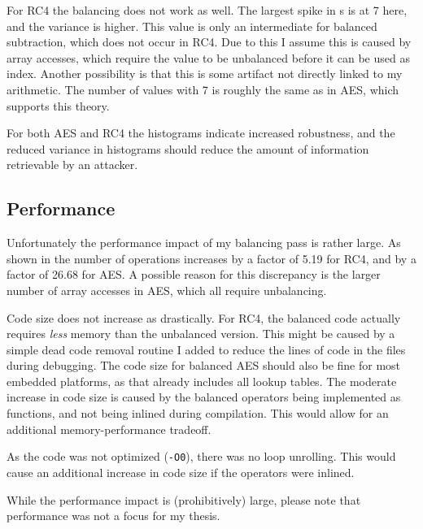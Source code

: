 For RC4 the balancing does not work as well.
The largest spike in \hammingw{}s is at 7 here, and the variance is higher.
This value is only an intermediate \hammingw{} for balanced subtraction, which does not occur in RC4.
Due to this I assume this is caused by array accesses, which require the value to be unbalanced before it can be used as index.
Another possibility is that this is some artifact not directly linked to my arithmetic.
The number of values with \hammingw{} 7 is roughly the same as in AES, which supports this theory.

For both AES and RC4 the histograms indicate increased robustness, and the reduced variance in histograms should reduce the amount of information retrievable by an attacker.

\subsection{Performance}
Unfortunately the performance impact of my balancing pass is rather large.
As shown in  the number of operations increases by a factor of 5.19 for RC4, and by a factor of 26.68 for AES.
A possible reason for this discrepancy is the larger number of array accesses in AES, which all require unbalancing.

Code size does not increase as drastically.
For RC4, the balanced code actually requires \emph{less} memory than the unbalanced version.
This might be caused by a simple dead code removal routine I added to reduce the lines of code in the \ir{} files during debugging.
The code size for balanced AES should also be fine for most embedded platforms, as that already includes all lookup tables.
The moderate increase in code size is caused by the balanced operators being implemented as functions, and not being inlined during compilation.
This would allow for an additional memory-performance tradeoff.

As the code was not optimized (\texttt{-O0}), there was no loop unrolling.
This would cause an additional increase in code size if the operators were inlined.

While the performance impact is (prohibitively) large, please note that performance was not a focus for my thesis.

